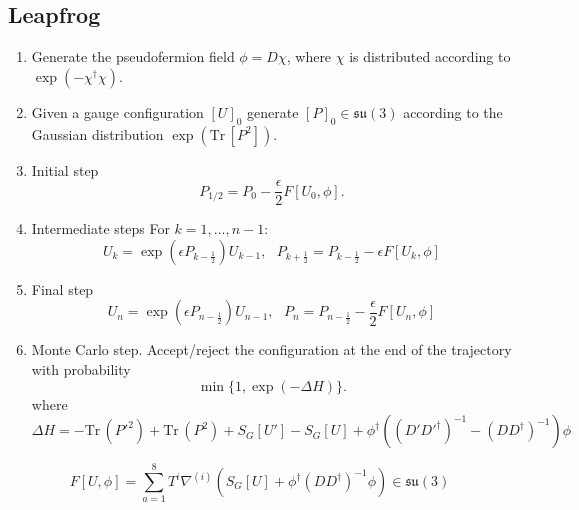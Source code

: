 \documentclass[12pt,a4paper]{article}
\newcommand{\tr}{\text{Tr}\,}
\newcommand{\su}[1]{\mathfrak{su}({#1})}
\begin{document}
\subsection{Leapfrog}
    \begin{enumerate}
        \item Generate the pseudofermion field $\phi = D\chi$, where $\chi$ is distributed according to $\exp(-\chi^{\dagger}\chi)$.
        \item Given a gauge configuration $[U]_0$ generate $[P]_0 \in \su{3}$ according to the Gaussian distribution $\exp(\tr[P^2])$.
        \item Initial step
            \begin{equation}
                P_{1/2} = P_0 - \frac{\epsilon}{2}F[U_0,\phi].
            \end{equation}
        \item Intermediate steps
        For $k = 1, \dots, n - 1 $:
            \begin{equation}
                U_{k} =  \exp\left( \epsilon P_{k-\frac{1}{2}}\right)U_{k-1} , \ \ \ P_{k+\frac{1}{2}} = P_{k-\frac{1}{2}} - \epsilon F[U_k,\phi]
            \end{equation}
        \item Final step
            \begin{equation}
                U_{n} =  \exp\left( \epsilon P_{n-\frac{1}{2}}\right)U_{n-1} , \ \ \ P_{n} = P_{n-\frac{1}{2}} - \frac{\epsilon}{2} F[U_n,\phi]
            \end{equation}
        \item Monte Carlo step. Accept/reject the configuration at the end of the trajectory with probability
            \begin{equation}
                \min\{1,\exp{\left(-\Delta H\right)}\}.
            \end{equation}
            where 
            \begin{equation}
                \Delta H = -\tr(P'^2) + \tr(P^2) + S_G[U'] - S_G[U] + \phi^{\dagger}\left( (D'D'^{\dagger})^{-1} - (DD^{\dagger})^{-1} \right)\phi
            \end{equation}
    \end{enumerate}

\begin{equation}
    F[U,\phi] = \sum_{a = 1}^8 T^i \nabla^{(i)} \left(S_G[U] + \phi^{\dagger}(DD^{\dagger})^{-1}\phi \right) \in \su{3}
\end{equation}
\end{document}
